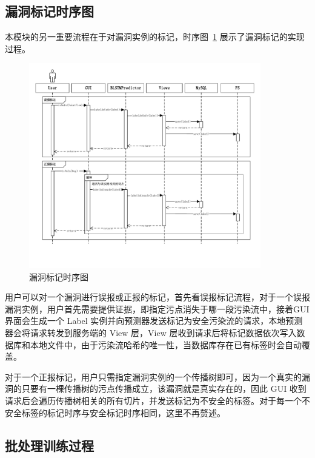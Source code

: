 \subsection{漏洞标记时序图}

本模块的另一重要流程在于对漏洞实例的标记，时序图~\ref{labelTime} 展示了漏洞标记的实现过程。

\begin{figure}[!htb]
    \centering
    \includegraphics[width=0.9\textwidth]{FIGs/chapter4/labelTime.pdf}
    \vspace{-1cm}
    \caption{漏洞标记时序图}\label{labelTime}
\end{figure}

用户可以对一个漏洞进行误报或正报的标记，首先看误报标记流程，对于一个误报漏洞实例，用户首先需要提供证据，即指定污点消失于哪一段污染流中，接着GUI界面会生成一个 Label 实例并向预测器发送标记为安全污染流的请求，本地预测器会将请求转发到服务端的 View 层，View 层收到请求后将标记数据依次写入数据库和本地文件中，由于污染流哈希的唯一性，当数据库存在已有标签时会自动覆盖。

对于一个正报标记，用户只需指定漏洞实例的一个传播树即可，因为一个真实的漏洞的只要有一棵传播树的污点传播成立，该漏洞就是真实存在的，因此 GUI 收到请求后会遍历传播树相关的所有切片，并发送标记为不安全的标签。对于每一个不安全标签的标记时序与安全标记时序相同，这里不再赘述。

\subsection{批处理训练过程}

